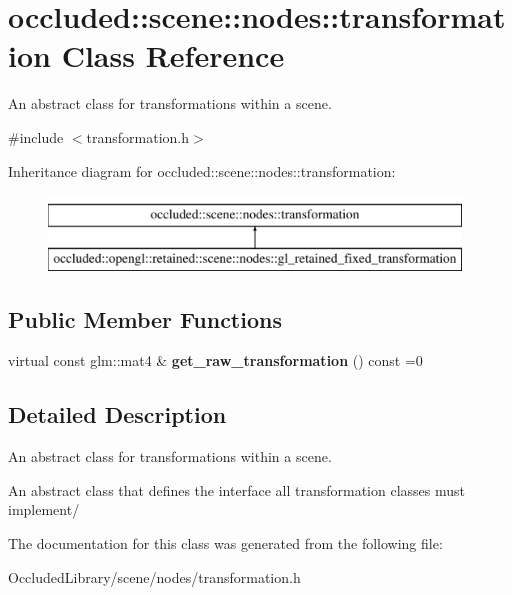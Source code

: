 \hypertarget{classoccluded_1_1scene_1_1nodes_1_1transformation}{\section{occluded\+:\+:scene\+:\+:nodes\+:\+:transformation Class Reference}
\label{classoccluded_1_1scene_1_1nodes_1_1transformation}
}


An abstract class for transformations within a scene.  




{\ttfamily \#include $<$transformation.\+h$>$}

Inheritance diagram for occluded\+:\+:scene\+:\+:nodes\+:\+:transformation\+:\begin{figure}[H]
\begin{center}
\leavevmode
\includegraphics[height=2.000000cm]{classoccluded_1_1scene_1_1nodes_1_1transformation}
\end{center}
\end{figure}
\subsection*{Public Member Functions}
\begin{DoxyCompactItemize}
\item 
\hypertarget{classoccluded_1_1scene_1_1nodes_1_1transformation_a52457e296c253bbd0035323e40cce1c8}{virtual const glm\+::mat4 \& {\bfseries get\+\_\+raw\+\_\+transformation} () const =0}\label{classoccluded_1_1scene_1_1nodes_1_1transformation_a52457e296c253bbd0035323e40cce1c8}

\end{DoxyCompactItemize}


\subsection{Detailed Description}
An abstract class for transformations within a scene. 

An abstract class that defines the interface all transformation classes must implement/ 

The documentation for this class was generated from the following file\+:\begin{DoxyCompactItemize}
\item 
Occluded\+Library/scene/nodes/transformation.\+h\end{DoxyCompactItemize}
